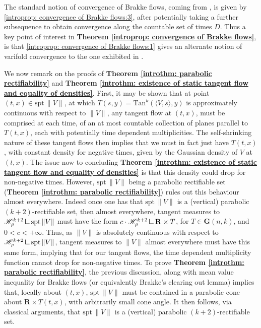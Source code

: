 \documentclass{article}
\theoremstyle{plain}
\theoremstyle{definition}
\theoremstyle{plain}
\theoremstyle{remark}
\theoremstyle{remark}
\theoremstyle{plain}
\newcommand{\weight}{\mathbin{\vrule height 1.6ex depth 0pt width
		0.14ex\vrule height 0.14ex depth 0pt width 1.3ex}}
\begin{document}
The standard notion of convergence of Brakke flows, coming from \cite[7.1]{Ilmanen-EllipticRegularization}, is given by \ref{introprop: convergence of Brakke flows:3}, after potentially taking a further subsequence to obtain convergence along the countable set of times $D$.
Thus a key point of interest in \textbf{Theorem \ref{introprop: convergence of Brakke flows}}, is that \ref{introprop: convergence of Brakke flows:1} gives an alternate notion of varifold convergence to the one exhibited in \cite[7.1(ii)]{Ilmanen-EllipticRegularization}.

We now remark on the proofs of \textbf{Theorem \ref{introthm: parabolic rectifiability}} and \textbf{Theorem \ref{introthm: existence of static tangent flow and equality of densities}}.
First, it may be shown that at point $(t, x) \in \mathrm{spt} \, \| V \|$, at which $T(s, y) = \mathrm{Tan}^{k} ( \langle V, s \rangle, y)$ is approximately continuous with respect to $\| V \|$, any tangent flow at $(t, x)$, must be comprised at each time, of an at most countable collection of planes parallel to $T (t, x)$, each with potentially time dependent multiplicities.
The self-shrinking nature of these tangent flows then implies that we must in fact just have $T (t, x)$, with constant density for negative times, given by the Gaussian density of $V$ at $(t, x)$. 
The issue now to concluding \textbf{Theorem \ref{introthm: existence of static tangent flow and equality of densities}} is that this density could drop for non-negative times. 
However, $\mathrm{spt} \, \| V \|$ being a parabolic rectifiable set (\textbf{Theorem \ref{introthm: parabolic rectifiability}}) rules out this behaviour almost everywhere.
Indeed once one has that $\mathrm{spt} \, \|V\|$ is a (vertical) parabolic $(k + 2)$-rectifiable set, then almost everywhere, tangent measures to $\mathscr{H}^{k + 2}_{\rho} \weight \mathrm{spt} \, \| V \|$ must have the form $c \cdot \mathscr{H}^{k + 2}_{\rho} \weight \mathbf{R} \times T$, for $T \in \mathbf{G} (n, k)$, and $0 < c < +\infty$. 
Thus, as $\| V \|$ is absolutely continuous with respect to $\mathscr{H}^{k + 2}_{\rho} \weight \mathrm{spt} \, \| V \|$, tangent measures to $\| V \|$ almost everywhere must have this same form, implying that for our tangent flows, the time dependent multiplicity function cannot drop for non-negative times.
To prove \textbf{Theorem \ref{introthm: parabolic rectifiability}}, the previous discussion, along with mean value inequality for Brakke flows (or equivalently Brakke's clearing out lemma) implies that, locally about $(t, x)$, $\mathrm{spt} \, \| V \|$ must be contained in a parabolic cone about $\mathbf{R} \times T (t, x)$, with arbitrarily small cone angle.
It then follows, via classical arguments, that $\mathrm{spt} \, \| V \|$ is a (vertical) parabolic $(k + 2)$-rectifiable set.
\end{document}

